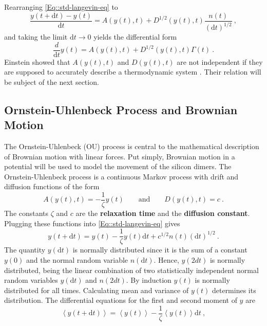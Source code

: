 	Rearranging \autoref{Eq::std-langevin-eq} to
	\begin{equation}
		\frac{y(t + \text{d}t) - y(t)}{\text{d}t} =	A(y(t), t) + D^{1/2} (y(t), t) \frac{n(t)}{(\text{d}t)^{1/2}} ~,
	\end{equation}
	and taking the limit $\text{d}t \rightarrow 0$ yields the differential form
	\begin{equation} \label{Eq::Differential-Langevin-eq}
		\frac{d}{\text{d}t} y(t) =	A(y(t), t) + D^{1/2}(y(t), t) \Gamma(t)~.
	\end{equation}
	Einstein showed that  $A(y(t), t)$ and $D(y(t), t)$ are not independent if they are supposed to accurately describe a thermodynamic system \cite{einstein1905molekularkinetischen}. Their relation will be subject of the next section.
	
	
	\subsection{Ornstein-Uhlenbeck Process and Brownian Motion} \label{Section::Brownian-Motion}
	The Ornstein-Uhlenbeck (OU) process is central to the mathematical description of Brownian motion with linear forces. Put simply, Brownian motion in a potential will be used to model the movement of the silicon dimers. The Ornstein-Uhlenbeck process is a continuous Markov process with drift and diffusion functions of the form
	\begin{equation}
		A(y(t), t) =	- \frac{1}{\zeta} y(t) \qquad \text{and} \qquad D(y(t), t) =	c~.
	\end{equation}
	The constants $\zeta$ and $c$ are the \textbf{relaxation time} and the \textbf{diffusion constant}. Plugging these functions into \autoref{Eq::std-langevin-eq} gives
	\begin{equation}\label{Eq::OU-Langevin}
		y(t + \text{d}t) =	y(t) - \frac{1}{\zeta} y(t) \text{d}t + c^{1/2} n(t) (\text{d}t)^{1/2}~.
	\end{equation}
	The quantity $y(\text{d}t)$ is normally distributed since it is the sum of a constant $y(0)$ and the normal random variable $n(\text{d}t)$. Hence, $y(2dt)$ is normally distributed, being the linear combination of two statistically independent normal random variables $y(\text{d}t)$ and $n(2dt)$. By induction $y(t)$ is normally distributed for all times. Calculating mean and variance of $y(t)$ determines its distribution.
	The differential equations for the first and second moment of $y$ are
	\begin{equation}
		\left \langle y(t + \text{d}t) \right \rangle =	\left \langle y(t) \right \rangle - \frac{1}{\zeta} \left \langle y(t) \right \rangle \text{d}t~,
	\end{equation}
